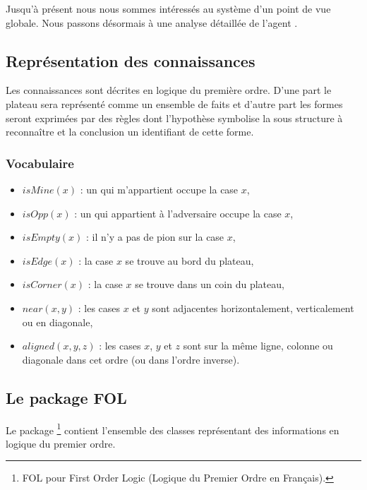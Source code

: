 Jusqu'à présent nous nous sommes intéressés au système d'un point de vue globale. Nous passons désormais à une analyse détaillée de l'agent \cogito{}.

\subsection{Représentation des connaissances}
\label{subsection_representation_co}
	Les connaissances sont décrites en logique du première ordre. D'une part le plateau sera représenté comme un ensemble de faits et d'autre part les \og formes \fg{} seront exprimées par des règles dont l'hypothèse symbolise la sous structure à reconnaître et la conclusion un identifiant de cette forme.
	
	\subsubsection{Vocabulaire} 
	\begin{itemize}
	\item $isMine(x)$ : un qui m'appartient occupe la case $x$,
  	\item $isOpp(x)$ : un qui appartient à l'adversaire occupe la case $x$,
  	\item $isEmpty(x)$ : il n'y a pas de pion sur la case $x$,
  	\item $isEdge(x)$ : la case $x$ se trouve au bord du plateau,
  	\item $isCorner(x)$ : la case $x$ se trouve dans un coin du plateau,
  	\item $near(x,y)$ : les cases $x$ et $y$ sont adjacentes horizontalement, verticalement ou en diagonale,
  	\item $aligned(x,y,z)$ : les cases $x$, $y$ et $z$ sont sur la même ligne, colonne ou diagonale dans cet ordre (ou dans l'ordre inverse).
	\end{itemize}

\label{specs_voc_fol}

\subsection{Le package FOL}
\label{subsection_fol}

Le package \footnote{FOL pour \og First Order Logic \fg{} (\og Logique du Premier Ordre \fg{} en Français). } contient l'ensemble des classes représentant des informations en logique du premier ordre.

